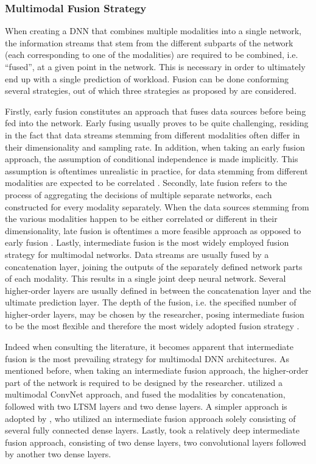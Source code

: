 \documentclass[fleqn,11pt]{paper}
\begin{document}
\subsubsection*{Multimodal Fusion Strategy}  
When creating a DNN that combines multiple modalities into a single network,  the information streams that stem from the different subparts of the network (each corresponding to one of the modalities) are required to be combined, i.e. \enquote{fused}, at a given point in the network. This is necessary in order to ultimately end up with a single prediction of workload. Fusion can be done conforming several strategies, out of which three strategies as proposed by  are considered.

Firstly, early fusion constitutes an approach that fuses data sources before being fed into the network. Early fusing usually proves to be quite challenging, residing in the fact that data streams stemming from different modalities often differ in their dimensionality and sampling rate. In addition, when taking an early fusion approach, the assumption of conditional independence is made implicitly. This assumption is oftentimes unrealistic in practice, for data stemming from different modalities are expected to be correlated \cite{ramachandram2017deep}. Secondly, late fusion refers to the process of aggregating the decisions of multiple separate networks, each constructed for every modality separately. When the data sources stemming from the various modalities happen to be either correlated or different in their dimensionality, late fusion is oftentimes a more feasible approach as opposed to early fusion \cite{ramachandram2017deep}. Lastly, intermediate fusion is the most widely employed fusion strategy for multimodal networks. Data streams are usually fused by a concatenation layer, joining the outputs of the separately defined network parts of each modality. This results in a single joint deep neural network. Several higher-order layers are usually defined in between the concatenation layer and the ultimate prediction layer. The depth of the fusion, i.e. the specified number of higher-order layers, may be chosen by the researcher, posing intermediate fusion to be the most flexible and therefore the most widely adopted fusion strategy \cite{ramachandram2017deep}.

Indeed when consulting the literature, it becomes apparent that intermediate fusion is the most prevailing strategy for multimodal DNN architectures. As mentioned before, when taking an intermediate fusion approach, the higher-order part of the network is required to be designed by the researcher.  utilized a multimodal ConvNet approach, and fused the modalities by concatenation, followed with two LTSM layers and two dense layers. A simpler approach is adopted by , who utilized an intermediate fusion approach solely consisting of several fully connected dense layers. Lastly,  took a relatively deep intermediate fusion approach, consisting of two dense layers, two convolutional layers followed by another two dense layers.  
\end{document}
